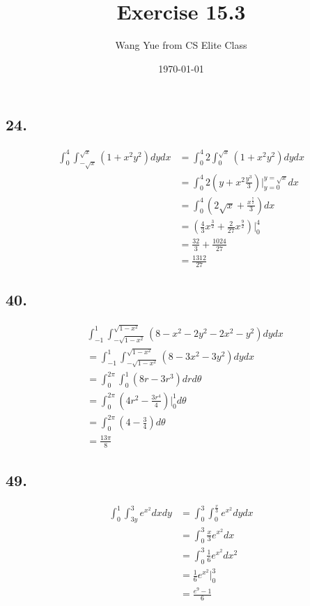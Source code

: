 \documentclass{article}
\begin{document}
  \title{Exercise 15.3}
  \author{Wang Yue from CS Elite Class}
  \date{\today}
  \maketitle

  \subsection*{24. }
  
  $$\begin{aligned}
    \int_0^4 \int_{-\sqrt x}^{\sqrt x} (1 + x^2y^2) dy dx &= \int_0^4 2 \int_0^{\sqrt x}(1+x^2y^2) dy dx \\
    &= \int_0^4 2 (y + x^2 \frac{y^3}{3})\biggl|_{y = 0}^{y = \sqrt x} dx \\
    &= \int_0^4 (2\sqrt x + \frac{x^{\frac 7 2}}{3}) dx \\
    &= (\frac 4 3 x^{\frac 3 2} + \frac{2}{27} x^{\frac 9 2})\biggl|_0^4 \\
    &= \frac{32}{3} + \frac{1024}{27} \\
    &= \frac{1312}{27}
  \end{aligned}$$

  \subsection*{40. }

  $$\begin{aligned}
    & \int_{-1}^1 \int_{-\sqrt{1-x^2}}^{\sqrt{1-x^2}}(8 - x^2 - 2y^2 - 2x^2 - y^2) dy dx \\
    &= \int_{-1}^1 \int_{-\sqrt{1-x^2}}^{\sqrt{1-x^2}}(8 - 3x^2-3y^2)dydx \\
    &= \int_0^{2\pi} \int_0^1 (8r - 3r^3) dr d\theta \\
    &= \int_0^{2\pi} (4r^2 - \frac{3r^4}{4})\biggl|_0^1 d\theta \\
    &= \int_0^{2\pi} (4 - \frac 3 4) d\theta \\
    &= \frac{13\pi}{8}
  \end{aligned}$$

  \subsection*{49. }

  $$\begin{aligned}
    \int_0^1 \int_{3y}^3 e^{x^2} dx dy &= \int_{0}^3 \int_0^{\frac x 3} e^{x^2}dydx \\
    &= \int_0^3 \frac x 3 e^{x^2} dx \\
    &= \int_0^3 \frac 1 6 e^{x^2} dx^2 \\
    &= \frac 1 6 e^{x^2}\biggl|_0^3 \\
    &= \frac{e^9 - 1}{6}
  \end{aligned}$$
\end{document}
